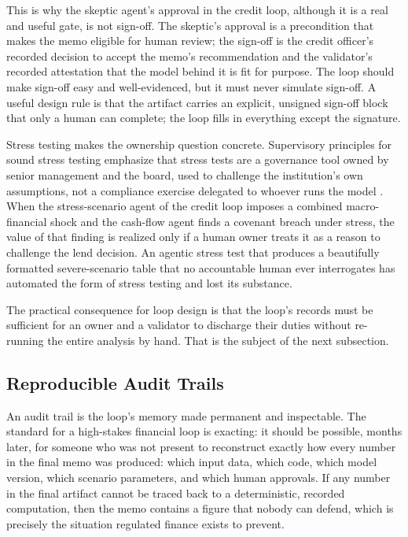 This is why the skeptic agent's approval in the credit loop, although it is a
real and useful gate, is not sign-off. The skeptic's approval is a precondition
that makes the memo eligible for human review; the sign-off is the credit
officer's recorded decision to accept the memo's recommendation and the
validator's recorded attestation that the model behind it is fit for purpose.
The loop should make sign-off easy and well-evidenced, but it must never
simulate sign-off. A useful design rule is that the artifact carries an explicit,
unsigned sign-off block that only a human can complete; the loop fills in
everything except the signature.

\begin{context}
Stress testing makes the ownership question concrete. Supervisory principles for
sound stress testing emphasize that stress tests are a governance tool owned by
senior management and the board, used to challenge the institution's own
assumptions, not a compliance exercise delegated to whoever runs the model
\citep{bcbs2018stress}. When the stress-scenario agent of the credit loop
imposes a combined macro-financial shock and the cash-flow agent finds a covenant
breach under stress, the value of that finding is realized only if a human owner
treats it as a reason to challenge the lend decision. An agentic stress test that
produces a beautifully formatted severe-scenario table that no accountable human
ever interrogates has automated the form of stress testing and lost its
substance.
\end{context}

The practical consequence for loop design is that the loop's records must be
sufficient for an owner and a validator to discharge their duties without
re-running the entire analysis by hand. That is the subject of the next
subsection.

\subsection{Reproducible Audit Trails}\label{subsec:audit-trails}

An audit trail is the loop's memory made permanent and inspectable. The standard
for a high-stakes financial loop is exacting: it should be possible, months
later, for someone who was not present to reconstruct exactly how every number in
the final memo was produced: which input data, which code, which model
version, which scenario parameters, and which human approvals. If any number in
the final artifact cannot be traced back to a deterministic, recorded
computation, then the memo contains a figure that nobody can defend, which is
precisely the situation regulated finance exists to prevent.

